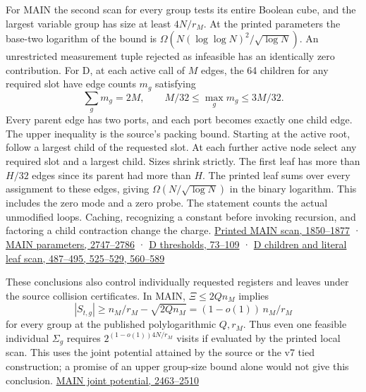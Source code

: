\documentclass[11pt,a4paper]{article}
\begin{document}
For MAIN the second scan for every group tests its entire Boolean cube,
and the largest variable group has size at least \(4N/r_M\). At the
printed parameters the base-two logarithm of the bound is
\(\Omega(N(\log\log N)^2/\sqrt{\log N})\). An unrestricted measurement
tuple rejected as infeasible has an identically zero contribution. For
D, at each active call of \(M\) edges, the 64 children for any required
slot have edge counts \(m_g\) satisfying \[
 \sum_g m_g=2M,\qquad M/32\le\max_gm_g\le 3M/32.
\tag{N2}
\] Every parent edge has two ports, and each port becomes exactly one
child edge. The upper inequality is the source's packing bound. Starting
at the active root, follow a largest child of the requested slot. At
each further active node select any required slot and a largest child.
Sizes shrink strictly. The first leaf has more than \(H/32\) edges since
its parent had more than \(H\). The printed leaf sums over every
assignment to these edges, giving \(\Omega(N/\sqrt{\log N})\) in the
binary logarithm. This includes the zero mode and a zero probe. The
statement counts the actual unmodified loops. Caching, recognizing a
constant before invoking recursion, and factoring a child contraction
change the charge.
\href{https://github.com/openai/math/blob/main/preprints/The-Exponential-Time-Hypothesis-is-False-October-25-2026/build/main_full_version.tex\#L1850}{Printed
MAIN scan, 1850--1877} ·
\href{https://github.com/openai/math/blob/main/preprints/The-Exponential-Time-Hypothesis-is-False-October-25-2026/build/main_full_version.tex\#L2747}{MAIN
parameters, 2747--2786} ·
\href{https://github.com/openai/math/blob/main/preprints/The-Exponential-Time-Hypothesis-is-False-October-25-2026/build/quantitative-contraction.tex\#L73}{D
thresholds, 73--109} ·
\href{https://github.com/openai/math/blob/main/preprints/The-Exponential-Time-Hypothesis-is-False-October-25-2026/build/quantitative-contraction.tex\#L560}{D
children and literal leaf scan, 487--495, 525--529, 560--589}

These conclusions also control individually requested registers and
leaves under the source collision certificates. In MAIN,
\(\Xi\le 2Qn_M\) implies \[
 |S_{t,g}| \ge n_M/r_M-\sqrt{2Qn_M}
       =(1-o(1))\, n_M/r_M
\] for every group at the published polylogarithmic \(Q,r_M\). Thus even
one feasible individual \(\Sigma_g\) requires \(2^{(1-o(1))4N/r_M}\)
visits if evaluated by the printed local scan. This uses the joint
potential attained by the source or the v7 tied construction; a promise
of an upper group-size bound alone would not give this conclusion.
\href{https://github.com/openai/math/blob/main/preprints/The-Exponential-Time-Hypothesis-is-False-October-25-2026/build/main_full_version.tex\#L2463}{MAIN
joint potential, 2463--2510}
\end{document}

